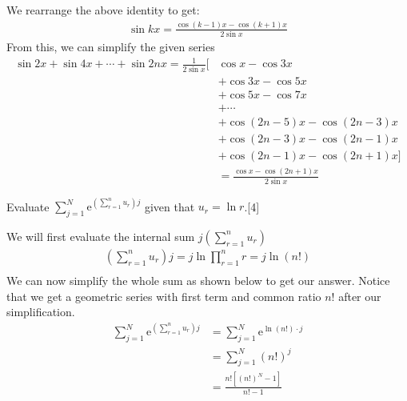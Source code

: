 \documentclass[12pt, a4 paper]{article}
\begin{document}
\begin{outline}[enumerate]
\begin{answer}
   We rearrange the above identity to get:
   \begin{align*}
     \sin{kx} = \frac{\cos{(k-1)x}-\cos{(k+1)x}}{2\sin x}
   \end{align*}
   From this, we can simplify the given series
   \begin{align*}
     \sin{2x}+\sin{4x}+\cdots+\sin{2nx} = \frac{1}{2\sin x}[& \cos x - \cos 3x \\
     & +\cos 3x - \cos 5x \\
     & +\cos5x - \cos 7x \\
     & +\cdots \\
     & +\cos{(2n-5)x} - \cos{(2n-3)x} \\
     & +\cos{(2n-3)x} - \cos{(2n-1)x} \\
     & +\cos{(2n-1)x} - \cos{(2n+1)x}] \\
     &= \frac{\cos x - \cos{(2n+1)x}}{2\sin x}
   \end{align*}
 \end{answer}

 \1 Evaluate \(\sum\limits_{j=1}^{N}\mathrm{e}^{\left(\sum\limits_{r=1}^{n}u_{r}\right)j}\) given that \(u_{r}=\ln{r}\).\hfill[4]%
 \begin{answer}
  We will first evaluate the internal sum \(j\left(\sum\limits_{r=1}^{n}u_{r}\right)\)
  \begin{align*}
   (\sum\limits_{r=1}^{n}u_{r})j= j\ln\prod_{r=1}^n r = j\ln{(n!)} \\
  \end{align*}
  We can now simplify the whole sum as shown below to get our answer. Notice that we get a geometric series with first term and common ratio \(n! \) after our simplification.
  \begin{align*}
   \sum\limits_{j=1}^{N}\mathrm{e}^{\left(\sum\limits_{r=1}^{n}u_{r}\right)j} & =      \sum\limits_{j=1}^{N}\mathrm{e}^{\ln(n!) \cdot j} \\
                                                                              & = \sum\limits_{j=1}^{N}{(n!)}^j                          \\
                                                                              & = \frac{n![{(n!)}^N-1]}{n!-1}
  \end{align*}
 \end{answer}
\end{outline}
\end{document}
